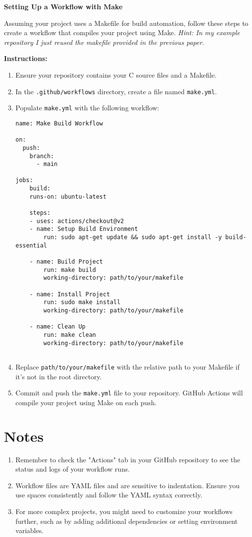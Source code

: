 \documentclass{dcbl/challenge}
\begin{document}
\begin{aufgabe}
\textbf{Setting Up a Workflow with Make}

Assuming your project uses a Makefile for build automation, follow these steps to create a workflow that compiles your project using Make.
\textit{Hint: In my example repository I just reused the makefile provided in the previous paper.}

\textbf{Instructions:}
\begin{enumerate}
    \item Ensure your repository contains your C source files and a Makefile.
    \item In the \texttt{.github/workflows} directory, create a file named \texttt{make.yml}.
    \item Populate \texttt{make.yml} with the following workflow:
\begin{verbatim}
name: Make Build Workflow

on:
  push:
    branch:
      - main

jobs:
    build:
    runs-on: ubuntu-latest
    
    steps:
    - uses: actions/checkout@v2
    - name: Setup Build Environment
        run: sudo apt-get update && sudo apt-get install -y build-essential

    - name: Build Project
        run: make build
        working-directory: path/to/your/makefile
    
    - name: Install Project
        run: sudo make install
        working-directory: path/to/your/makefile
  
    - name: Clean Up
        run: make clean
        working-directory: path/to/your/makefile
        

\end{verbatim}
    \item Replace \texttt{path/to/your/makefile} with the relative path to your Makefile if it's not in the root directory.
    \item Commit and push the \texttt{make.yml} file to your repository. GitHub Actions will compile your project using Make on each push.
\end{enumerate}
\end{aufgabe}

\section*{Notes}
\begin{enumerate}
    \item Remember to check the "Actions" tab in your GitHub repository to see the status and logs of your workflow runs.
    \item Workflow files are YAML files and are sensitive to indentation. Ensure you use spaces consistently and follow the YAML syntax correctly.
    \item For more complex projects, you might need to customize your workflows further, such as by adding additional dependencies or setting environment variables.
\end{enumerate}
\end{document}
